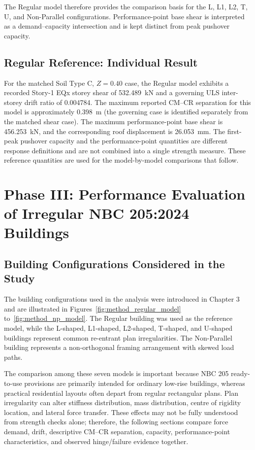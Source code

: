 The Regular model therefore provides the comparison basis for the L, L1, L2, T, U, and Non-Parallel configurations. Performance-point base shear is interpreted as a demand--capacity intersection and is kept distinct from peak pushover capacity.

\subsection{Regular Reference: Individual Result}
For the matched Soil Type C, $Z=0.40$ case, the Regular model exhibits a recorded Story-1 EQx storey shear of 532.489~kN and a governing ULS inter-storey drift ratio of 0.004784. The maximum reported CM--CR separation for this model is approximately 0.398~m (the governing case is identified separately from the matched shear case). The maximum performance-point base shear is 456.253~kN, and the corresponding roof displacement is 26.053~mm. The first-peak pushover capacity and the performance-point quantities are different response definitions and are not combined into a single strength measure. These reference quantities are used for the model-by-model comparisons that follow.

\section{Phase III: Performance Evaluation of Irregular NBC 205:2024 Buildings}



\subsection{Building Configurations Considered in the Study}
The building configurations used in the analysis were introduced in Chapter 3 and are illustrated in Figures~\ref{fig:method_regular_model} to~\ref{fig:method_np_model}. The Regular building was used as the reference model, while the L-shaped, L1-shaped, L2-shaped, T-shaped, and U-shaped buildings represent common re-entrant plan irregularities. The Non-Parallel building represents a non-orthogonal framing arrangement with skewed load paths.

The comparison among these seven models is important because NBC 205 ready-to-use provisions are primarily intended for ordinary low-rise buildings, whereas practical residential layouts often depart from regular rectangular plans. Plan irregularity can alter stiffness distribution, mass distribution, centre of rigidity location, and lateral force transfer. These effects may not be fully understood from strength checks alone; therefore, the following sections compare force demand, drift, descriptive CM--CR separation, capacity, performance-point characteristics, and observed hinge/failure evidence together.

